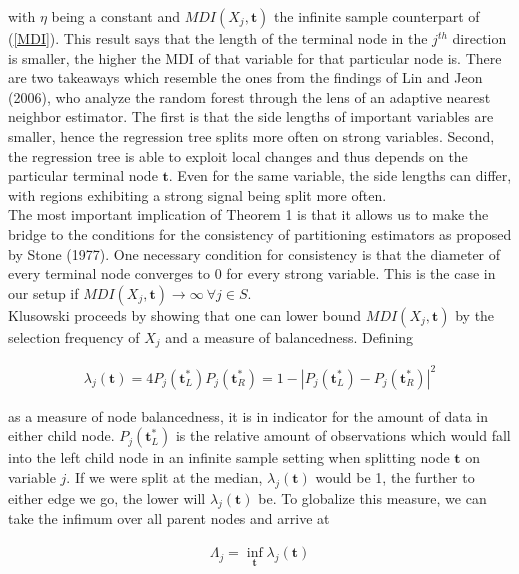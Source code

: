 with $\eta$ being a constant and $MDI(X_j, \mathbf{t})$ the infinite sample counterpart of (\ref{MDI}).
This result says that the length of the terminal node in the $j^{th}$ direction is smaller, the higher the MDI of that variable for that particular node is.
There are two takeaways which resemble the ones from the findings of Lin and Jeon (2006), who analyze the random forest through the lens of an adaptive nearest neighbor estimator. 
The first is that the side lengths of important variables are smaller, hence the regression tree splits more often on strong variables.
Second, the regression tree is able to exploit local changes and thus depends on the particular terminal node $\mathbf{t}$. 
Even for the same variable, the side lengths can differ, with regions exhibiting a strong signal being split more often. \\

The most important implication of Theorem 1 is that it allows us to make the bridge to the conditions for the consistency of partitioning estimators as proposed by Stone (1977). 
One necessary condition for consistency is that the diameter of every terminal node converges to 0 for every strong variable. 
This is the case in our setup if $MDI(X_j, \mathbf{t}) \rightarrow \infty \ \forall j \in S$. \\
Klusowski proceeds by showing that one can lower bound $MDI(X_j, \mathbf{t})$ by the selection frequency of $X_j$ and a measure of balancedness. 
Defining

\begin{align}
    \lambda_j(\mathbf{t}) = 4 P_j(\mathbf{t}_L^*) P_j(\mathbf{t}_R^*) = 1 - |P_j(\mathbf{t}_L^*) - P_j(\mathbf{t}_R^*)|^2 \nonumber
\end{align}

as a measure of node balancedness, it is in indicator for the amount of data in either child node. 
$P_j(\mathbf{t}_L^*)$ is the relative amount of observations which would fall into the left child node in an infinite sample setting when splitting node $\mathbf{t}$ on variable $j$.
If we were split at the median, $\lambda_j(\mathbf{t})$ would be 1, the further to either edge we go, the lower will $\lambda_j(\mathbf{t})$ be.
To globalize this measure, we can take the infimum over all parent nodes and arrive at 

\begin{align}
    \Lambda_j = \inf_{\mathbf{t}} \lambda_j(\mathbf{t}) \label{lambda}
\end{align}

